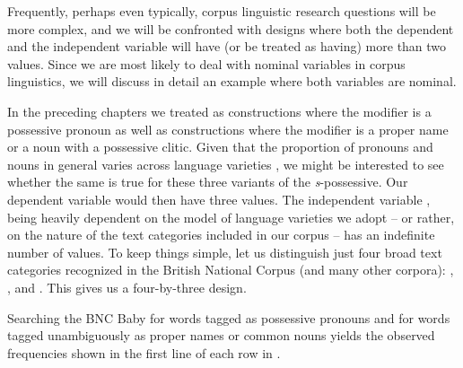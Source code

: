 Frequently, perhaps even typically, corpus linguistic research questions will be more complex, and we will be confronted with designs  where both the dependent and the independent variable will have (or be treated as having) more than two values. Since we are most likely to deal with nominal  variables in corpus linguistics, we will discuss in detail an example where both variables are nominal.

In the preceding chapters we treated as   constructions where the modifier is a possessive pronoun as well as constructions where the modifier is a proper name or a noun  with a possessive clitic.  Given that the proportion of pronouns  and nouns in general varies across language varieties  \citep{biber_longman_1999}, we might be interested to see whether the same is true for these three variants of the \textit{s}-possessive. Our dependent variable   would then have three values. The independent variable ,  being heavily dependent on the model of language varieties  we adopt -- or rather, on the nature of the text categories included in our corpus -- has an indefinite number of values. To keep things simple, let us distinguish just four broad text categories recognized in the British National Corpus (and many other corpora): ,  ,    and . This gives us a four\hyp{}by\hyp{}three  design.

Searching the BNC Baby  for words tagged  as possessive  pronouns  and for words tagged unambiguously as proper names or common nouns  yields the observed frequencies  shown in the first line of each row in .

